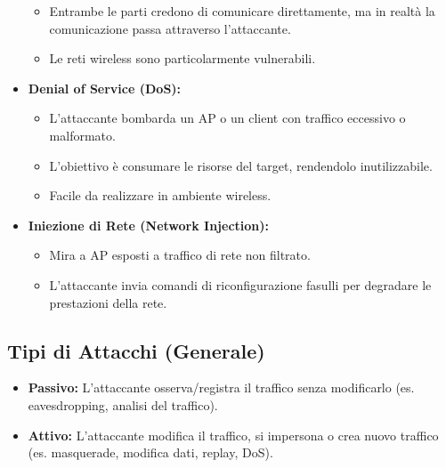 \documentclass{article}
\begin{document}
\begin{itemize}
\begin{itemize}
        \item Entrambe le parti credono di comunicare direttamente, ma in realtà la comunicazione passa attraverso l'attaccante.
        \item Le reti wireless sono particolarmente vulnerabili.
    \end{itemize}
    \item \textbf{Denial of Service (DoS):}
    \begin{itemize}
        \item L'attaccante bombarda un AP o un client con traffico eccessivo o malformato.
        \item L'obiettivo è consumare le risorse del target, rendendolo inutilizzabile.
        \item Facile da realizzare in ambiente wireless.
    \end{itemize}
    \item \textbf{Iniezione di Rete (Network Injection):}
    \begin{itemize}
        \item Mira a AP esposti a traffico di rete non filtrato.
        \item L'attaccante invia comandi di riconfigurazione fasulli per degradare le prestazioni della rete.
    \end{itemize}
\end{itemize}

\subsection{Tipi di Attacchi (Generale)}
\begin{itemize}
    \item \textbf{Passivo:} L'attaccante osserva/registra il traffico senza modificarlo (es. eavesdropping, analisi del traffico).
    \item \textbf{Attivo:} L'attaccante modifica il traffico, si impersona o crea nuovo traffico (es. masquerade, modifica dati, replay, DoS).
\end{itemize}
\end{document}
